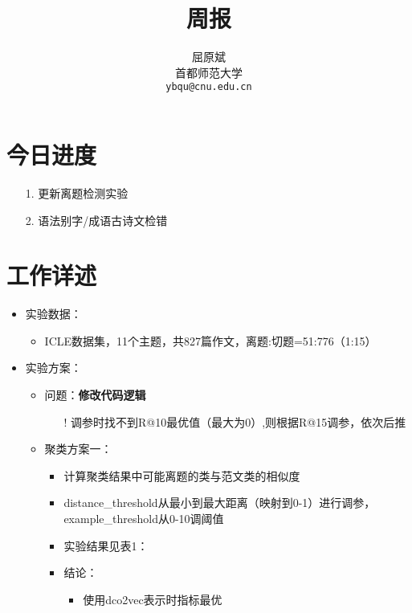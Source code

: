 \documentclass[11pt]{article}
\title{周报}
\author{屈原斌 \\
  首都师范大学 \\
    {\tt ybqu@cnu.edu.cn}}
\date{}
\begin{document}
\begin{CJK}{UTF8}{gkai}

\maketitle
\CJKindent


\section{今日进度}


\begin{itemize}
  \item [1.] 更新离题检测实验
  \item [2.] 语法别字/成语古诗文检错
\end{itemize}

\section{工作详述}
\begin{itemize}
  \item 实验数据：
  \begin{itemize}
    \item ICLE数据集，11个主题，共827篇作文，离题:切题=51:776（1:15）
  \end{itemize}
  \item 实验方案：
  \begin{itemize}
    \item 问题：\textbf{修改代码逻辑}
    \begin{itemize}
      \item [!] 调参时找不到R@10最优值（最大为0）,则根据R@15调参，依次后推
    \end{itemize}
    \item 聚类方案一：
    \begin{itemize}
      \item 计算聚类结果中可能离题的类与范文类的相似度
      \item distance\_threshold从最小到最大距离（映射到0-1）进行调参，example\_threshold从0-10调阈值
      \item 实验结果见表1：
      \item 结论：
      \begin{itemize}
        \item 使用dco2vec表示时指标最优
      \end{itemize}
    \end{itemize}
    

\end{itemize}
\end{itemize}
\end{CJK}
\end{document}
